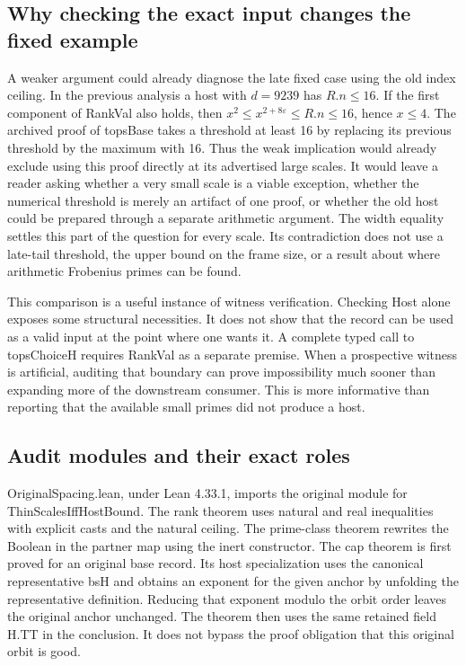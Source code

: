 \documentclass[12pt,letterpaper]{article}
\DeclareRobustCommand{\id}[1]{\mbox{\small\ttfamily #1}}
\begin{document}
\subsection{Why checking the exact input changes the fixed example}

A weaker argument could already diagnose the late fixed case using the old index ceiling. In the previous analysis a host with $d=9239$ has $R.n\le16$. If the first component of \id{RankVal} also holds, then $x^2\le x^{2+8\varepsilon}\le R.n\le16$, hence $x\le4$. The archived proof of \id{topsBase} takes a threshold at least 16 by replacing its previous threshold by the maximum with 16. Thus the weak implication would already exclude using this proof directly at its advertised large scales. It would leave a reader asking whether a very small scale is a viable exception, whether the numerical threshold is merely an artifact of one proof, or whether the old host could be prepared through a separate arithmetic argument. The width equality settles this part of the question for every scale. Its contradiction does not use a late-tail threshold, the upper bound on the frame size, or a result about where arithmetic Frobenius primes can be found.

This comparison is a useful instance of witness verification. Checking \id{Host} alone exposes some structural necessities. It does not show that the record can be used as a valid input at the point where one wants it. A complete typed call to \id{topsChoiceH} requires \id{RankVal} as a separate premise. When a prospective witness is artificial, auditing that boundary can prove impossibility much sooner than expanding more of the downstream consumer. This is more informative than reporting that the available small primes did not produce a host.

\subsection{Audit modules and their exact roles}

\id{OriginalSpacing.lean}, under Lean 4.33.1, imports the original module for \id{ThinScalesIffHostBound}. The rank theorem uses natural and real inequalities with explicit casts and the natural ceiling. The prime-class theorem rewrites the Boolean in the partner map using the inert constructor. The cap theorem is first proved for an original base record. Its host specialization uses the canonical representative \id{bsH} and obtains an exponent for the given anchor by unfolding the representative definition. Reducing that exponent modulo the orbit order leaves the original anchor unchanged. The theorem then uses the same retained field \id{H.TT} in the conclusion. It does not bypass the proof obligation that this original orbit is good.
\end{document}
